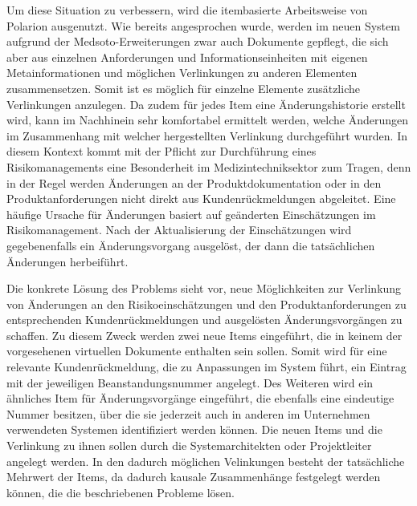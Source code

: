 \documentclass[a4paper,12pt]{report}
\begin{document}
Um diese Situation zu verbessern, wird die itembasierte Arbeitsweise von Polarion ausgenutzt. Wie bereits angesprochen wurde, werden im neuen System aufgrund der Medsoto-Erweiterungen zwar auch Dokumente gepflegt, die sich aber aus einzelnen Anforderungen und Informationseinheiten mit eigenen Metainformationen und möglichen Verlinkungen zu anderen Elementen zusammensetzen. Somit ist es möglich für einzelne Elemente zusätzliche Verlinkungen anzulegen. Da zudem für jedes Item eine Änderungshistorie erstellt wird, kann im Nachhinein sehr komfortabel ermittelt werden, welche Änderungen im Zusammenhang mit welcher hergestellten Verlinkung durchgeführt wurden. In diesem Kontext kommt mit der Pflicht zur Durchführung eines Risikomanagements eine Besonderheit im Medizintechniksektor zum Tragen, denn in der Regel werden Änderungen an der Produktdokumentation oder in den Produktanforderungen nicht direkt aus Kundenrückmeldungen abgeleitet. Eine häufige Ursache für Änderungen basiert auf geänderten Einschätzungen im Risikomanagement. Nach der Aktualisierung der Einschätzungen wird gegebenenfalls ein Änderungsvorgang ausgelöst, der dann die tatsächlichen Änderungen herbeiführt. 

Die konkrete Lösung des Problems sieht vor, neue Möglichkeiten zur Verlinkung von Änderungen an den Risikoeinschätzungen und den Produktanforderungen zu entsprechenden Kundenrückmeldungen und ausgelösten Änderungsvorgängen zu schaffen. Zu diesem Zweck werden zwei neue Items eingeführt, die in keinem der vorgesehenen virtuellen Dokumente enthalten sein sollen. Somit wird für eine relevante Kundenrückmeldung, die zu Anpassungen im System führt, ein Eintrag mit der jeweiligen Beanstandungsnummer angelegt. Des Weiteren wird ein ähnliches Item für Änderungsvorgänge eingeführt, die ebenfalls eine eindeutige Nummer besitzen, über die sie jederzeit auch in anderen im Unternehmen verwendeten Systemen identifiziert werden können. Die neuen Items und die Verlinkung zu ihnen sollen durch die Systemarchitekten oder Projektleiter angelegt werden. In den dadurch möglichen Velinkungen besteht der tatsächliche Mehrwert der Items, da dadurch kausale Zusammenhänge festgelegt werden können, die die beschriebenen Probleme lösen.
\end{document}
